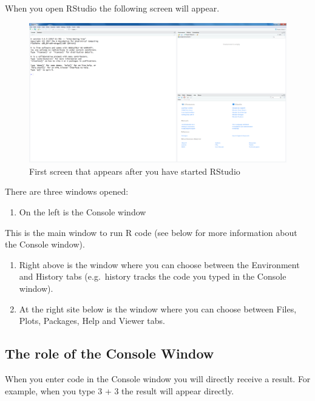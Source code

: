 \documentclass[
]{book}
\providecommand{\tightlist}{%
  \setlength{\itemsep}{0pt}\setlength{\parskip}{0pt}}
\begin{document}
When you open RStudio the following screen will appear.

\begin{figure}

{\centering \includegraphics[width=0.95\linewidth]{images/fig1.10} 

}

\caption{First screen that appears after you have started RStudio}\label{fig:fig10}
\end{figure}

There are three windows opened:

\begin{enumerate}
\def\labelenumi{\arabic{enumi}.}
\tightlist
\item
  On the left is the Console window
\end{enumerate}

This is the main window to run R code (see below for more information about the Console window).

\begin{enumerate}
\def\labelenumi{\arabic{enumi}.}
\setcounter{enumi}{1}
\item
  Right above is the window where you can choose between the Environment and History tabs (e.g.~history tracks the code you typed in the Console window).
\item
  At the right site below is the window where you can choose between Files, Plots, Packages, Help and Viewer tabs.
\end{enumerate}

\hypertarget{the-role-of-the-console-window}{%
\subsection{The role of the Console Window}\label{the-role-of-the-console-window}}

When you enter code in the Console window you will directly receive a result. For example, when you type 3 + 3 the result will appear directly.
\end{document}
